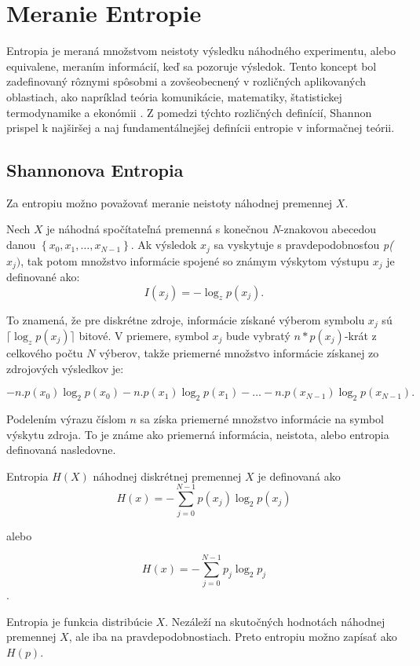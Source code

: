 \section{Meranie Entropie}
Entropia je meraná množstvom neistoty výsledku náhodného experimentu, alebo equivalene, meraním informácií, keď sa pozoruje výsledok. Tento koncept bol zadefinovaný rôznymi spôsobmi \cite{kosko25, renyi30} a zovšeobecnený v rozličných aplikovaných oblastiach, ako napríklad teória komunikácie, matematiky, štatistickej termodynamike a ekonómii \cite{belahut31, cover33}. Z pomedzi týchto rozličných definícií, Shannon prispel k najširšej a naj fundamentálnejšej definícii entropie v informačnej teórii. 
% 
% 

\subsection*{Shannonova Entropia}
Za entropiu možno považovať meranie neistoty náhodnej premennej $X$.
\begin{defn} 
	Nech $X$ je náhodná spočítateľná premenná s konečnou \textit{N}-znakovou abecedou danou $ \left\{ x_0, x_1, \dots, x_{N-1} \right\}$.
	Ak výsledok $x_j$ sa vyskytuje s pravdepodobnosťou \textit{p($x_j)$}, tak potom množstvo informácie spojené so známym výskytom výstupu $x_j$ je definované ako:
	$$ I(x_j)=-\log_z p(x_j). $$
\end{defn}
To znamená, že pre diskrétne zdroje, informácie získané výberom symbolu $x_j$ sú $\lceil \log_zp(x_j)  \rceil$ bitové. V priemere, symbol $x_j$ bude vybratý $n*p(x_j)$-krát z celkového počtu $N$ výberov, takže priemerné množstvo informácie získanej zo zdrojových výsledkov je:

$$
-n.p(x_0)\log_2p(x_0) - n.p(x_1)\log_2p(x_1) - \ldots 
-n.p(x_{N-1})\log_2p(x_{N-1}).
$$

Podelením výrazu číslom $n$ sa získa priemerné množstvo informácie na symbol výskytu zdroja. To je známe ako priemerná informácia, neistota, alebo entropia definovaná nasledovne.

\begin{defn}  Entropia $H(X)$ náhodnej diskrétnej premennej $X$ je definovaná ako 
	$$H\left(x\right)=-\sum\limits_{j=0}^{N-1}p\left(x_j\right)\log_2p\left(x_j\right) $$
	
	alebo
	
	$$H\left(x\right)=-\sum\limits_{j=0}^{N-1}p_j
	\log_2p_j$$.
\end{defn}
Entropia je funkcia distribúcie $X$. Nezáleží na skutočných hodnotách náhodnej premennej $X$, ale iba na pravdepodobnostiach. Preto entropiu možno zapísať ako $H(p)$.

